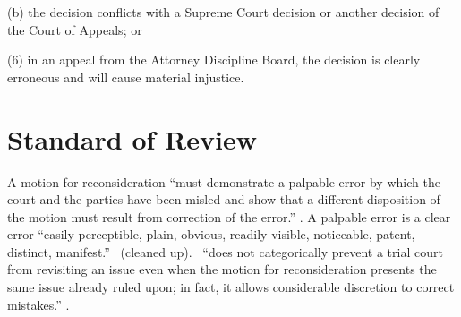 \documentclass[12pt,\documentclassflag]{michiganCourtOfAppealsBrief}
\begin{document}
(b)   the decision conflicts with a Supreme Court decision or another decision of the Court of Appeals; or

(6)   in an appeal from the Attorney Discipline Board, the decision is clearly erroneous and will cause material injustice.

\section{Standard of Review}



A motion for reconsideration ``must demonstrate a palpable error by which the court and the parties have been misled and show that a different disposition of the motion must result from correction of the error.''
\cite{MCL 2.119(F)(3)}.
 A palpable error is a clear error ``easily perceptible, plain, obvious, readily
 visible, noticeable, patent, distinct, manifest.''
 \ (cleaned up).
 \cite[s]{MCL 2.119(F)(3)}\ ``does not categorically prevent a trial court from revisiting an issue even when the motion for reconsideration presents the same issue already ruled upon; in fact, it allows considerable discretion to correct mistakes.''
. 

 

\end{document}
